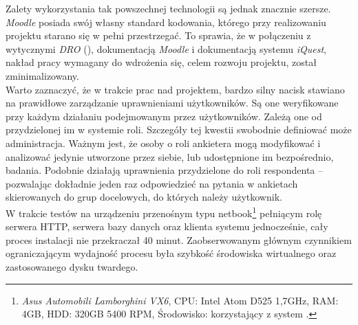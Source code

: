 Zalety wykorzystania tak powszechnej technologii są jednak znacznie szersze. \textit{Moodle} posiada swój własny standard kodowania, którego przy realizowaniu projektu starano się w pełni przestrzegać. To sprawia, że w połączeniu z wytycznymi \textit{DRO} (), dokumentacją \textit{Moodle} i dokumentacją systemu \textit{iQuest}, nakład pracy wymagany do wdrożenia się, celem rozwoju projektu, został zminimalizowany. \\

Warto zaznaczyć, że w trakcie prac nad projektem, bardzo silny nacisk stawiano na prawidłowe zarządzanie uprawnieniami użytkowników. Są one weryfikowane przy każdym działaniu podejmowanym przez użytkowników. Zależą one od przydzielonej im w systemie roli. Szczegóły tej kwestii swobodnie definiować może administracja. Ważnym jest, że osoby o roli ankietera mogą modyfikować i analizować jedynie utworzone przez siebie, lub udostępnione im bezpośrednio, badania. Podobnie działają uprawnienia przydzielone do roli respondenta -- pozwalając dokładnie jeden raz odpowiedzieć na pytania w ankietach skierowanych do grup docelowych, do których należy użytkownik. \\

W trakcie testów na urządzeniu przenośnym typu netbook\footnote{\textit{Asus Automobili Lamborghini VX6}, CPU: Intel Atom D525 1,7GHz, RAM: 4GB, HDD: 320GB 5400 RPM, Środowisko: korzystający z  system .} pełniącym rolę serwera HTTP, serwera bazy danych oraz klienta systemu jednocześnie, cały proces instalacji nie przekraczał 40 minut. Zaobserwowanym głównym czynnikiem ograniczającym wydajność procesu była szybkość środowiska wirtualnego oraz zastosowanego dysku twardego.

